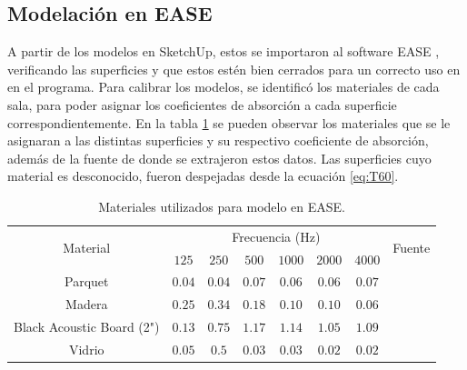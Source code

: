 \subsection{Modelación en EASE}
A partir de los modelos en SketchUp, estos se importaron al software EASE \cite{ease}, verificando las superficies y que estos estén bien cerrados para un correcto uso en en el programa. Para calibrar los modelos, se identificó los materiales de cada sala, para poder asignar los coeficientes de absorción a cada superficie correspondientemente. En la tabla \ref{tab:materiales-ease} se pueden observar los materiales que se le asignaran a las distintas superficies y su respectivo coeficiente de absorción, además de la fuente de donde se extrajeron estos datos. Las superficies cuyo material es desconocido, fueron despejadas desde la ecuación \ref{eq:T60}.



\begin{table}[H]
    \centering
    \caption{Materiales utilizados para modelo en EASE.}
    \label{tab:materiales-ease}
    \begin{tabular}{|c|cccccc|c|}
    \hline
    \multirow{2}{*}{Material} & \multicolumn{6}{c|}{Frecuencia (Hz)}                                                                          & \multirow{2}{*}{Fuente} \\ \cline{2-7} 
            & \multicolumn{1}{c|}{$125$} & \multicolumn{1}{c|}{$250$} & \multicolumn{1}{c|}{$500$} & \multicolumn{1}{c|}{$1000$} & \multicolumn{1}{c|}{$2000$} & $4000$ & \\ \hline
    Parquet & \multicolumn{1}{c|}{$0.04$} & \multicolumn{1}{c|}{$0.04$} & \multicolumn{1}{c|}{$0.07$} & \multicolumn{1}{c|}{$0.06$} & \multicolumn{1}{c|}{$0.06$} &  $0.07$ & \cite{Recuero}\\ \hline
    Madera  & \multicolumn{1}{c|}{$0.25$} & \multicolumn{1}{c|}{$0.34$} & \multicolumn{1}{c|}{$0.18$} & \multicolumn{1}{c|}{$0.10$} & \multicolumn{1}{c|}{$0.10$} &  $0.06$ & \cite{Recuero}\\  \hline
    Black Acoustic Board (2") & \multicolumn{1}{c|}{$0.13$} & \multicolumn{1}{c|}{$0.75$} & \multicolumn{1}{c|}{$1.17$} & \multicolumn{1}{c|}{$1.14$} & \multicolumn{1}{c|}{$1.05$} & $1.09$ & \cite{blackboard}\\ \hline
    Vidrio  & \multicolumn{1}{c|}{$0.05$} & \multicolumn{1}{c|}{$0.5$} & \multicolumn{1}{c|}{$0.03$} & \multicolumn{1}{c|}{$0.03$} & \multicolumn{1}{c|}{$0.02$} & $0.02$ & \cite{Recuero}\\ \hline
    \end{tabular}
\end{table}

